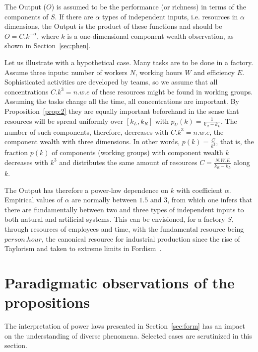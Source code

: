 \documentclass[10pt,letterpaper]{article}
\begin{document}
The Output ($O$)
is assumed to be the performance (or richness) in terms of the components of $S$.
If there are $\alpha$ types of independent inputs, i.e. resources in $\alpha$ dimensions,
the Output is the product of these functions and should be
$O =C.k^{-\alpha}$, where $k$ is a one-dimensional component wealth observation,
as shown in Section~\ref{sec:phen}. 

Let us illustrate with a hypothetical case.
Many tasks are to be done in a factory.
Assume three inputs:
number of workers $N$, working hours $W$
and efficiency $E$.
Sophisticated activities are developed by teams,
so we assume that all concentrations $C.k^3=n.w.e$
of these resources might be found in working groups.
Assuming the tasks change all the time,
all concentrations are important.
By Proposition~\ref{prop:2} they are equally important beforehand
in the sense that 
resources will be spread uniformly over $[k_L,k_R]$
with $p_U(k)=\frac{1}{k_R-k_L}$.
The number of such components, therefore,
decreases with $C.k^3=n.w.e$, the component wealth with three dimensions.
In other words,
$p(k)=\frac{C}{k^3}$, that is,
the fraction $p(k)$ of components (working groups) with component wealth $k$
decreases with $k^3$ and distributes the same
amount of resources $C=\frac{N.W.E}{k_R-k_L}$ along $k$.

The Output has therefore a power-law dependence on $k$ with coefficient $\alpha$. Empirical values of $\alpha$
are normally between $1.5$ and $3$, from which one infers that there are fundamentally between two and three types of independent inputs to both natural and artificial systems. This can be envisioned, for a factory $S$, through resources of employees and time, with the fundamental resource being $person . hour$, the canonical resource for industrial production since the rise of Taylorism and taken to extreme limits in Fordism~\cite{fordism}.

\section{Paradigmatic observations of the propositions}\label{sec:par}
The interpretation of power laws presented in Section~\ref{sec:form} has an impact on the
understanding of
diverse phenomena. Selected cases are scrutinized in this section.
 
\end{document}
